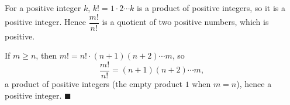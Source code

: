 For a positive integer $k$, $k!=1\cdot2\cdots k$ is a product of positive integers, so it is a positive integer. Hence $\dfrac{m!}{n!}$ is a quotient of two positive numbers, which is positive.

If $m\ge n$, then $m!=n!\cdot(n+1)(n+2)\cdots m$, so
\[\dfrac{m!}{n!}=(n+1)(n+2)\cdots m,\]
a product of positive integers (the empty product $1$ when $m=n$), hence a positive integer. $\blacksquare$
